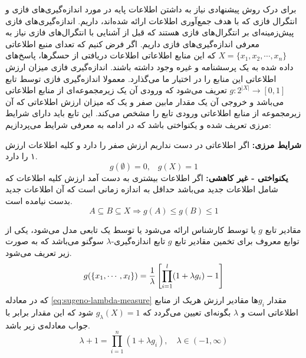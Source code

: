 \label{SEC:FI_PREVIEW}
برای درک روش پیشنهادی نیاز به داشتن اطلاعات پایه در مورد اندازه‌گیری‌های فازی و انتگرال فازی که با هدف جمع‌آوری اطلاعات ارائه شده‌اند، داریم. اندازه‌گیری‌های فازی پیش‌زمینه‌ای بر انتگرال‌های فازی هستند که قبل از آشنایی با انتگرال‌های فازی نیاز به معرفی اندازه‌گیری‌های فازی داریم. اگر فرض کنیم که تعدای منبع اطلاعاتی
$X = \{x_1, x_2, \cdots, x_n\}$
که این منابع اطلاعاتی اطلاعات دریافتی از حسگرها، پاسخ‌های داده شده به یک پرسشنامه و غیره وجود داشته باشند. اندازه‌گیری فازی میزان ارزش اطلاعاتی این منابع را در اختیار ما می‌گذارد. معمولا اندازه‌گیری فازی توسط تابع
$g : 2^{|X|} \rightarrow [0, 1]$
تعریف می‌شود که ورودی آن یک زیرمجموعه‌ای از منابع اطلاعاتی می‌باشد و خروجی آن یک مقدار مابین صفر و یک که میزان ارزش اطلاعاتی که آن زیرمجموعه از منابع اطلاعاتی ورودی تابع را مشخص می‌کند.
این تابع باید دارای شرایط مرزی تعریف شده و یکنواختی باشد که در ادامه به معرفی شرایط می‌پردازیم:

\begin{enumerate}
 \textbf{شرایط مرزی:}
اگر اطلاعاتی در دست نداریم ارزش صفر را دارد و کلیه اطلاعات ارزش ۱ را دارد.
\begin{equation}
g(\emptyset) = 0,\hspace{10pt} g(X) = 1
\end{equation}
 \textbf{یکنواختی - غیر کاهشی:}
اگر اطلاعات بیشتری به دست آمد ارزش کلیه اطلاعات که شامل اطلاعات جدید می‌باشد حداقل به اندازه زمانی است که آن اطلاعات جدید بدست نیامده است.
\begin{equation}
A \subseteq B \subseteq X \Rightarrow g(A) \leq g(B) \leq 1
\end{equation}
\end{enumerate}

مقادیر تابع $g$ یا توسط کارشناس ارائه می‌شود یا توسط یک تابعی مدل می‌شود، یکی از توابع معروف برای تخمین مقادیر تابع $g$ تابع اندازه‌گیری-$\lambda$ سوگنو می‌باشد که به صورت زیر تعریف می‌شود.
\begin{equation}\label{eq:sugeno-lambda-measure}
g(\{x_1,\cdots,x_l\}) = {1 \over \lambda}\left[\prod_{i=1}^l(1 + \lambda g_i) - 1\right]
\end{equation}
که در معادله \ref{eq:sugeno-lambda-measure} مقدار $g_i$ها مقادیر ارزش هریک از منابع اطلاعاتی است و $\lambda$ بگونه‌ای تعیین می‌گردد که $g_\lambda(X) = 1$ شود که این مقدار برابر با جواب معادله‌ی زیر باشد.
\begin{equation}\label{eq:sugeno-lambda-measure:rooting}
\lambda + 1 = \prod_{i=1}^{n} (1 + \lambda g_i), \hspace{1em} \lambda \in (-1, \infty) 
\end{equation}

